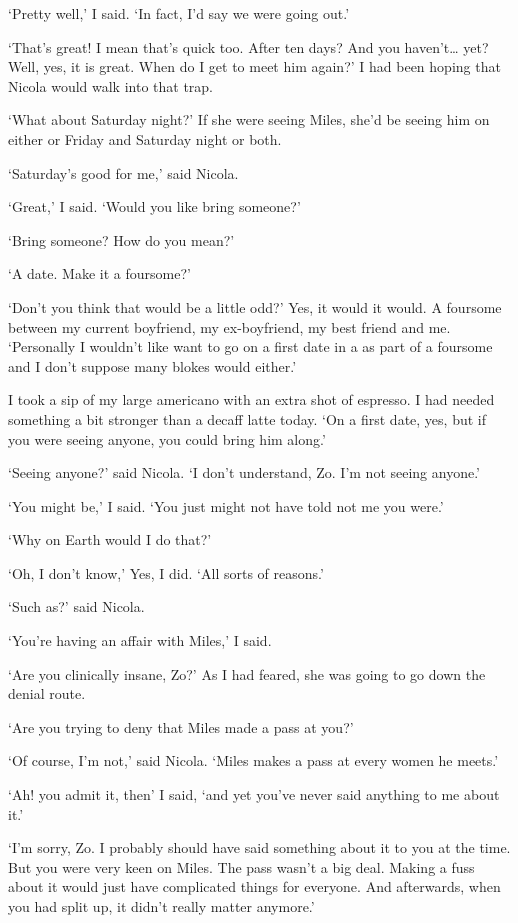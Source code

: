 `Pretty well,' I said. `In fact, I'd say we were going out.'

`That's great! I mean that's quick too. After ten days? And you haven't{\dots} yet? Well, yes, it is great. When do I get to meet him again?' I had been hoping that Nicola would walk into that trap.

`What about Saturday night?' If she were seeing Miles, she'd be
seeing him on either or Friday and Saturday night or both.

`Saturday's good for me,' said Nicola.

`Great,' I said. `Would you like bring someone?'

`Bring someone? How do you mean?'

`A date. Make it a foursome?'

`Don't you think that would be a little odd?' Yes, it would it
would. A foursome between my current boyfriend, my ex-boyfriend, my
best friend and me. `Personally I wouldn't like want to go on a first date in a
as part of a foursome and I don't suppose many blokes would either.'

I took a sip of my large americano with an extra shot of espresso. I had needed something a bit
stronger than a decaff latte today. `On a first date, yes, but if you were seeing anyone, you
could bring him along.'

`Seeing anyone?' said Nicola. `I don't understand, Zo. I'm not seeing anyone.'

`You might be,' I said. `You just might not have told not me
you were.'

`Why on Earth would I do that?'

`Oh, I don't know,' Yes, I did. `All sorts of reasons.'

`Such as?' said Nicola.

`You're having an affair with Miles,' I said.

`Are you clinically insane, Zo?' As I had feared, she was going
to go down the denial route.

`Are you trying to deny that Miles made a pass at you?'

`Of course, I'm not,' said Nicola. `Miles makes a pass at every women he meets.'

`Ah! you admit it, then' I said, `and yet you've never said anything to me about it.'

`I'm sorry, Zo. I probably should have said something about it to you at the time. But you were very keen on Miles. The pass wasn't a big deal. Making a fuss about it would just have complicated things for everyone. And afterwards, when you had split up, it didn't really matter anymore.'

